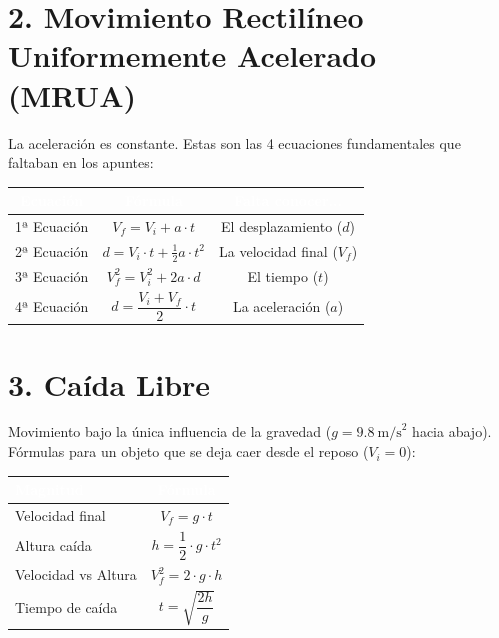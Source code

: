\documentclass[10pt,a4paper]{article}
\begin{document}
\section{2. Movimiento Rectilíneo Uniformemente Acelerado (MRUA)}

La aceleración es constante. Estas son las 4 ecuaciones fundamentales que faltaban en los apuntes:

\vspace{4pt}
\begin{tabularx}{\textwidth}{CCC}
  \toprule
  \textbf{\textcolor{white}{Ecuación}} &
  \textbf{\textcolor{white}{Fórmula}} &
  \textbf{\textcolor{white}{Falta conocer...}} \\
  \midrule
  1ª Ecuación & $V_f = V_i + a \cdot t$          & El desplazamiento ($d$) \\
  2ª Ecuación & $d = V_i \cdot t + \frac{1}{2} a \cdot t^2$ & La velocidad final ($V_f$) \\
  3ª Ecuación & $V_f^2 = V_i^2 + 2 a \cdot d$   & El tiempo ($t$) \\
  4ª Ecuación & $d = \dfrac{V_i + V_f}{2} \cdot t$ & La aceleración ($a$) \\
  \bottomrule
\end{tabularx}
\vspace{12pt}

\section{3. Caída Libre}

Movimiento bajo la única influencia de la gravedad ($g = 9.8\ \text{m/s}^2$ hacia abajo). Fórmulas para un objeto que se deja caer desde el reposo ($V_i = 0$):

\vspace{4pt}
\begin{tabularx}{\textwidth}{LC}
  \toprule
  \textbf{\textcolor{white}{Magnitud}} &
  \textbf{\textcolor{white}{Fórmula}} \\
  \midrule
  Velocidad final   & $V_f = g \cdot t$ \\
  Altura caída      & $h = \dfrac{1}{2} \cdot g \cdot t^2$ \\
  Velocidad vs Altura & $V_f^2 = 2 \cdot g \cdot h$ \\
  Tiempo de caída   & $t = \sqrt{\dfrac{2h}{g}}$ \\
  \bottomrule
\end{tabularx}
\vspace{12pt}
\end{document}
